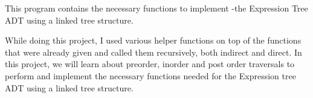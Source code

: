 This program contains the necessary functions to implement -\/the Expression Tree A\+DT using a linked tree structure.

While doing this project, I used various helper functions on top of the functions that were already given and called them recursively, both indirect and direct. In this project, we will learn about preorder, inorder and post order traversals to perform and implement the necessary functions needed for the Expression tree A\+DT using a linked tree structure. 
